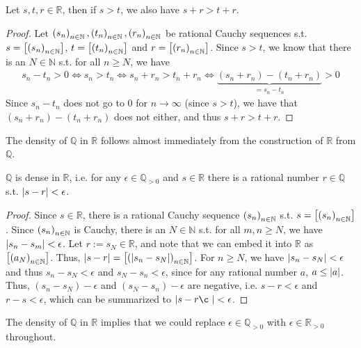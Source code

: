 \begin{theorem}
	Let $s, t, r\in\mathbb R$, then if $s > t$, we also have $s + r > t + r$.
\end{theorem}

\begin{proof}
	Let $\seq[s_n], \seq[t_n], \seq[r_n]$ be rational Cauchy sequences s.t. $s = \left[\seq[s_n]\right]$, $t = \left[\seq[t_n]\right]$ and $r = \left[\seq[r_n]\right]$. Since $s > t$, we know that there is an $N\in\mathbb N$ s.t. for all $n\geq N$, we have 
	\begin{align*}
		s_n - t_n > 0\Leftrightarrow s_n > t_n \Leftrightarrow s_n + r_n > t_n + r_n \Leftrightarrow \underbrace{(s_n + r_n) - (t_n + r_n)}_{=s_n - t_n} > 0
	\end{align*}
	Since $s_n - t_n$ does not go to $0$ for $n\to\infty$ (since $s > t$), we have that $(s_n + r_n) - (t_n + r_n)$ does not either, and thus $s + r > t + r$.
\end{proof}

The density of $\mathbb Q$ in $\mathbb R$ follows almost immediately from the construction of $\mathbb R$ from $\mathbb Q$.

\begin{theorem}\label{thrm:Q_dense_R}
	$\mathbb Q$ is dense in $\mathbb R$, i.e. for any $\epsilon \in\mathbb Q_{> 0}$ and $s\in\mathbb R$ there is a rational number $r\in\mathbb Q$ s.t. $\abs{s - r} < \epsilon$.
\end{theorem}

\begin{proof}
	Since $s\in\mathbb R$, there is a rational Cauchy sequence $\seq[s_n]$ s.t. $s = \left[\seq[s_n]\right]$. Since $\seq[s_n]$ is Cauchy, there is an $N\in\mathbb N$ s.t. for all $m, n\geq N$, we have $\abs{s_n - s_m} < \epsilon$. Let $r := s_N\in\mathbb R$, and note that we can embed it into $\mathbb R$ as $\left[\seq[a_N]\right]$. Thus, ${\abs{s - r} = \left[\seq[\abs{s_n - s_N}]\right]}$. For $n\geq N$, we have $\abs{s_n - s_N} < \epsilon$ and thus $s_n - s_N < \epsilon$ and $s_N - s_n < \epsilon$, since for any rational number $a$, $a \leq \abs{a}$. Thus, $\left(s_n - s_N\right) - \epsilon$ and $\left(s_N - s_n\right) - \epsilon$ are negative, i.e. $s - r < \epsilon$ and $r - s < \epsilon$, which can be summarized to $\abs{s - r¸} < \epsilon$.
\end{proof}

\begin{remark}
	The density of $\mathbb Q$ in $\mathbb R$ implies that we could replace $\epsilon\in\mathbb Q_{> 0}$ with $\epsilon\in\mathbb R_{>0}$ throughout.
\end{remark}

